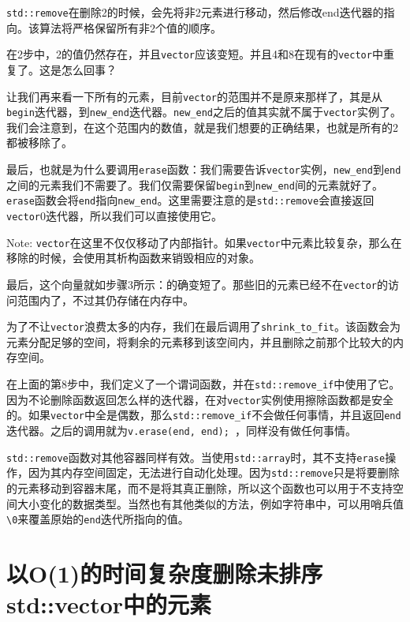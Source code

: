 \texttt{std::remove}在删除2的时候，会先将非2元素进行移动，然后修改end迭代器的指向。该算法将严格保留所有非2个值的顺序。

在2步中，2的值仍然存在，并且\texttt{vector}应该变短。并且4和8在现有的\texttt{vector}中重复了。这是怎么回事？

让我们再来看一下所有的元素，目前\texttt{vector}的范围并不是原来那样了，其是从\texttt{begin}迭代器，到\texttt{new\_end}迭代器。\texttt{new\_end}之后的值其实就不属于\texttt{vector}实例了。我们会注意到，在这个范围内的数值，就是我们想要的正确结果，也就是所有的2都被移除了。

最后，也就是为什么要调用\texttt{erase}函数：我们需要告诉\texttt{vector}实例，\texttt{new\_end}到\texttt{end}之间的元素我们不需要了。我们仅需要保留\texttt{begin}到\texttt{new\_end}间的元素就好了。\texttt{erase}函数会将\texttt{end}指向\texttt{new\_end}。这里需要注意的是\texttt{std::remove}会直接返回\texttt{vector}0迭代器，所以我们可以直接使用它。

\begin{myInfoBox}
Note: \texttt{vector}在这里不仅仅移动了内部指针。如果\texttt{vector}中元素比较复杂，那么在移除的时候，会使用其析构函数来销毁相应的对象。
\end{myInfoBox}

最后，这个向量就如步骤3所示：的确变短了。那些旧的元素已经不在\texttt{vector}的访问范围内了，不过其仍存储在内存中。

为了不让\texttt{vector}浪费太多的内存，我们在最后调用了\texttt{shrink\_to\_fit}。该函数会为元素分配足够的空间，将剩余的元素移到该空间内，并且删除之前那个比较大的内存空间。

在上面的第8步中，我们定义了一个谓词函数，并在\texttt{std::remove\_if}中使用了它。因为不论删除函数返回怎么样的迭代器，在对\texttt{vector}实例使用擦除函数都是安全的。如果\texttt{vector}中全是偶数，那么\texttt{std::remove\_if}不会做任何事情，并且返回\texttt{end}迭代器。之后的调用就为\texttt{v.erase(end, end); }，同样没有做任何事情。


\texttt{std::remove}函数对其他容器同样有效。当使用\texttt{std::array}时，其不支持\texttt{erase}操作，因为其内存空间固定，无法进行自动化处理。因为\texttt{std::remove}只是将要删除的元素移动到容器末尾，而不是将其真正删除，所以这个函数也可以用于不支持空间大小变化的数据类型。当然也有其他类似的方法，例如字符串中，可以用哨兵值\texttt{\textbackslash{}0}来覆盖原始的\texttt{end}迭代所指向的值。


\section{以O(1)的时间复杂度删除未排序std::vector中的元素}

